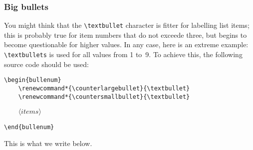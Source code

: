 \documentclass[a4paper]{article}
\DeclareRobustCommand*{\meta}[1]{\mbox{\(\langle\textit{#1}\rangle\)}}
\begin{document}
\subsubsection{Big bullets}
\label{SSS:Xmp-Big}

You might think that the \verb|\textbullet| character is fitter for
labelling list items; this is probably true for item numbers that do
not exceede three, but begins to become questionable for higher
values.  In any case, here is an extreme example: \verb|\textbullets|
is used for all values from 1 to~9.  To achieve this, the following
source code should be used:
%
\begin{verbatim}
\begin{bullenum}
    \renewcommand*{\counterlargebullet}{\textbullet}
    \renewcommand*{\countersmallbullet}{\textbullet}
\end{verbatim}
\begin{flushleft}
	\texttt{\ \ \ \ }\meta{items}
\end{flushleft}
\begin{verbatim}
\end{bullenum}
\end{verbatim}
%
This is what we write below.
\end{document}
